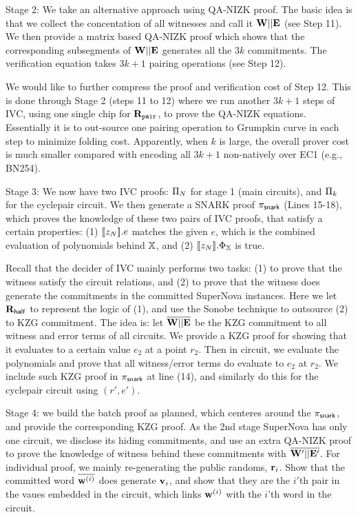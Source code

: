 Stage 2: We take an alternative approach 
using QA-NIZK proof. The basic idea is that
we collect the concentation of all witnesses and call it
${{\mathbf {W}}} || {{\mathbf {E}}}$ (see Step 11). We then provide
a matrix based QA-NIZK proof which shows that the corresponding
subsegments of ${{\mathbf {W}}} || {{\mathbf {E}}}$ generates 
all the $3k$ commitments. The verification equation takes
$3k+1$ pairing operations (see Step 12). 

We would like to further compress the proof and verification cost 
of Step 12. This is done through Stage 2 (steps 11 to 12) where
we run another $3k+1$ steps of IVC, using one single chip
for $\mathbf{R}_\texttt{pair}$, to prove the QA-NIZK equations. Essentially it is
to out-source one pairing operation to Grumpkin curve in each step to
minimize folding cost. Apparently, when $k$ is large, the overall
prover cost is much smaller compared with encoding all $3k+1$
non-natively over EC1 (e.g., BN254).

Stage 3: We now have two IVC proofs: ${\Pi}_N$ for stage 1 (main circuits),
and ${\Pi}_k$ for the cyclepair circuit. We then generate a SNARK
proof $\pi_{\mathsf{snark}}$ (Lines 15-18), which proves the knowledge
of these two pairs of IVC proofs, that satisfy a certain properties:
(1) $[\![z_N]\!].e$ matches the given $e$, which is the combined
evaluation of polynomials behind $\mathbb{X}$, and (2)
$[\![z_N]\!].{\Phi_{\mathbb{X}}}$ is true.

Recall that the decider of IVC mainly performs two tasks: (1) to prove
that the witness satisfy the circuit relations, and (2) to prove that
the witness does generate the commitments in the committed SuperNova instances.
Here we let $\mathbf{R}_{\mathsf{half}}$ to represent the logic of (1), and use the
Sonobe technique to outsource (2) to KZG commitment. The idea is:
let $\overline{{{\mathbf {W}}} || {{\mathbf {E}}}}$ be the KZG commitment to
all witness and error terms of all circuits. We provide a KZG proof
for showing that it evaluates to a certain value $e_2$ at a point $r_2$.
Then in circuit, we evaluate the polynomials and prove that all witness/error
terms do evaluate to $e_2$ at $r_2$. We include such KZG proof
in $\pi_{\mathsf{snark}}$ at line (14), and similarly do this for the 
cyclepair circuit using $(r', e')$.

Stage 4: we build the batch proof as planned, which centeres around
the $\pi_{\mathsf{snark}}$, and provide the corresponding KZG proof.
As the 2nd stage SuperNova has only one circuit, we disclose its
hiding commitments, and use an extra QA-NIZK proof to prove
the knowledge of witness behind these commitments with
$\overline{{{\mathbf {W'}}} || {{\mathbf {E'}}}}$.
For individual proof, we mainly re-generating the public randoms,
${{\mathbf {r}}}_i$. Show that the committed word $\overline{{{\mathbf {w}}}^{(i)}}$
does generate ${{\mathbf {v}}}_i$, and show that they are the
$i'$th pair in the vaues embedded in the circuit, which links
${{\mathbf {w}}}^{(i)}$ with the $i$'th word in the circuit.

